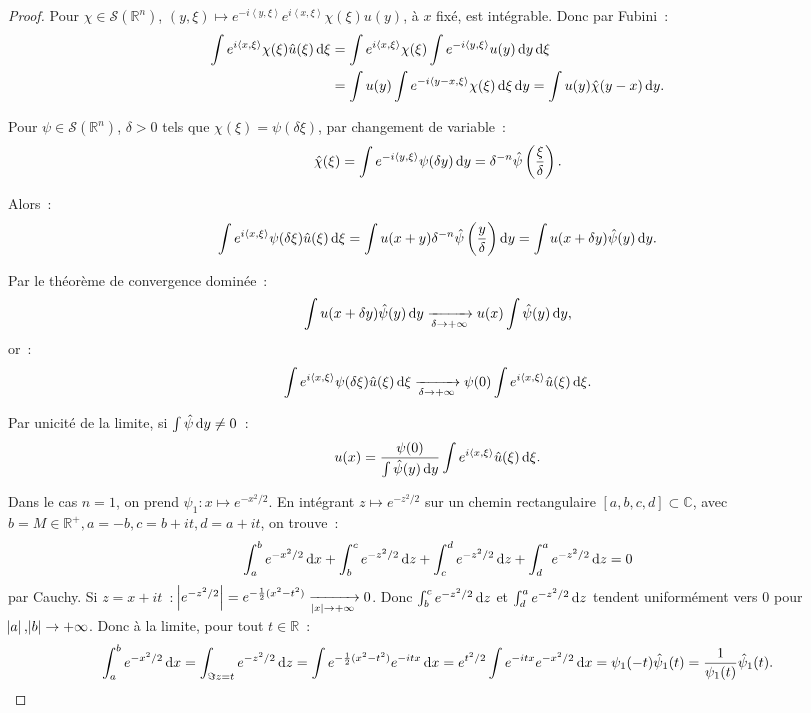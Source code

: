 \documentclass{report}
\newcommand{\C}{{\mathbb C}}
\newcommand{\R}{{\mathbb R}}
\newcommand{\scpr}[2]{\left\langle#1, #2\right\rangle}
\newcommand{\pinfty}{{+\infty}}
\newcommand{\dx}{\dif x}
\theoremstyle{definition}
\theoremstyle{remark}
\begin{document}
\begin{proof} Pour $\chi \in \mathcal S(\R^n)$, $(y, \xi) \mapsto e^{-i\scpr y\xi}e^{i\scpr x\xi}\chi(\xi)u(y)$, à $x$ fixé, est intégrable. Donc par Fubini~:
\begin{align*}
	\int e^{i\scpr x\xi}\chi(\xi)\hat u(\xi)\dif\xi &= \int e^{i\scpr x\xi}\chi(\xi)\int e^{-i\scpr y\xi}u(y)\dif y\dif\xi \\
	&= \int u(y)\int e^{-i\scpr {y-x}\xi}\chi(\xi)\dif\xi \dif y = \int u(y)\hat \chi(y-x)\dif y.
\end{align*}

Pour $\psi \in \mathcal S(\R^n)$, $\delta > 0$ tels que $\chi(\xi) = \psi(\delta\xi)$, par changement de variable~:
\[\hat \chi(\xi) = \int e^{-i\scpr y\xi}\psi(\delta y)\dif y = \delta^{-n}\hat \psi\left(\frac \xi\delta\right).\]

Alors~:
\[\int e^{i\scpr x\xi}\psi(\delta\xi)\hat u(\xi)\dif\xi = \int u(x+y)\delta^{-n}\hat \psi\left(\frac y\delta\right)\dif y = \int u(x+\delta y)\hat \psi(y)\dif y.\]

Par le théorème de convergence dominée~:
\[\int u(x+\delta y)\hat \psi(y)\dif y \xrightarrow[\delta \to \pinfty]{} u(x)\int \hat \psi(y)\dif y,\]
or~:
\[\int e^{i\scpr x\xi}\psi(\delta \xi)\hat u(\xi)\dif\xi \xrightarrow[\delta \to \pinfty]{} \psi(0)\int e^{i\scpr x\xi}\hat u(\xi)\dif\xi.\]

Par unicité de la limite, si $\int \hat \psi \dif y\neq 0$~:
\begin{equation}\label{eq:inversion Fourier proof}
	u(x) = \frac {\psi(0)}{\int\hat \psi(y)\dif y}\int e^{i\scpr x\xi}\hat u(\xi)\dif\xi.
\end{equation}

Dans le cas $n=1$, on prend $\psi_1 : x \mapsto e^{-x^2/2}$. En intégrant $z \mapsto e^{-z^2/2}$ sur un chemin rectangulaire $[a,b,c,d] \subset \C$,
avec $b = M \in \R^+, a=-b, c = b+it, d = a+it$, on trouve~:
\[\int_a^b e^{-x^2/2}\dx + \int_b^c e^{-z^2/2}\dif z + \int_c^d e^{-z^2/2}\dif z + \int_d^a e^{-z^2/2}\dif z = 0\]
par Cauchy. Si $z = x+it$~: $\abs {e^{-z^2/2}} = e^{-\frac 12(x^2-t^2)} \xrightarrow[\abs x \to \pinfty]{} 0$. Donc $\int_b^c e^{-z^2/2}\dif z$ et $\int_d^a e^{-z^2/2}\dif z$
tendent uniformément vers $0$ pour $\abs a, \abs b \to \pinfty$. Donc à la limite, pour tout $t \in \R$~:
\[\int_a^b e^{-x^2/2}\dx = \int_{\Im z = t}e^{-z^2/2}\dif z = \int e^{-\frac 12(x^2-t^2)}e^{-itx}\dx = e^{t^2/2}\int e^{-itx}e^{-x^2/2}\dif x = \psi_1(-t)\hat\psi_1(t)
	= \frac 1{\psi_1(t)}\hat\psi_1(t).\]


\end{proof}
\end{document}
